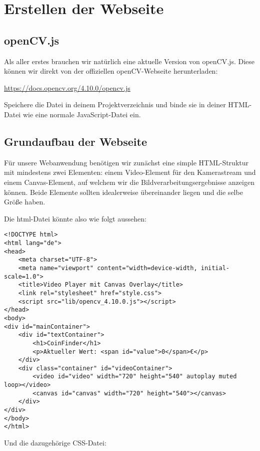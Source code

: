\section{Erstellen der Webseite}

\subsection{openCV.js}
Als aller erstes brauchen wir natürlich eine aktuelle Version von openCV.js. Diese können wir direkt von der offiziellen openCV-Webseite herunterladen:

\href{https://docs.opencv.org/4.10.0/opencv.js}{https://docs.opencv.org/4.10.0/opencv.js}

Speichere die Datei in deinem Projektverzeichnis und binde sie in deiner HTML-Datei wie eine normale JavaScript-Datei ein.

\subsection{Grundaufbau der Webseite}
Für unsere Webanwendung benötigen wir zunächst eine simple HTML-Struktur mit mindestens zwei Elementen: einem Video-Element für den Kamerastream und einem Canvas-Element, auf welchem wir die Bildverarbeitungsergebnisse anzeigen können. Beide Elemente sollten idealerweise übereinander liegen und die selbe Größe haben.

Die html-Datei könnte also wie folgt aussehen:
\begin{lstlisting}[style=HTML]
<!DOCTYPE html>
<html lang="de">
<head>
    <meta charset="UTF-8">
    <meta name="viewport" content="width=device-width, initial-scale=1.0">
    <title>Video Player mit Canvas Overlay</title>
    <link rel="stylesheet" href="style.css">
    <script src="lib/opencv_4.10.0.js"></script>
</head>
<body>
<div id="mainContainer">
    <div id="textContainer">
        <h1>CoinFinder</h1>
        <p>Aktueller Wert: <span id="value">0</span>€</p>
    </div>
    <div class="container" id="videoContainer">
        <video id="video" width="720" height="540" autoplay muted loop></video>
        <canvas id="canvas" width="720" height="540"></canvas>
    </div>
</div>
</body>
</html>
\end{lstlisting}

Und die dazugehörige CSS-Datei:

